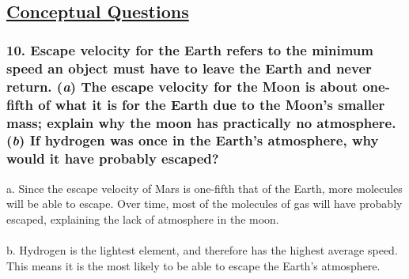 \documentclass{article}
\title{
    \vspace{2in}
    \textmd{\textbf{\hmwkTitle}}\\
    \vspace{0.5in}
    \textmd{\textbf{\hmwkClass}}\\
    \vspace{4in}
}
\author{\hmwkAuthorName}
\date{}
\begin{document}
\maketitle
\newpage
\begin{center}
    \section*{\textbf{\underline {Conceptual Questions}}}
\end{center}
\subsubsection*{
    10. Escape velocity for the Earth refers to the minimum speed an object must have
    to leave the Earth and never return. (\textit{a}) The escape velocity for the Moon
    is about one-fifth of what it is for the Earth due to the Moon's smaller mass;
    explain why the moon has practically no atmosphere. (\textit{b}) If hydrogen was
    once in the Earth's atmosphere, why would it have probably escaped?
}
a. Since the escape velocity of Mars is one-fifth that of the Earth, more molecules will be able to escape. Over time, most of the molecules of gas will have probably escaped, explaining the lack of atmosphere in the moon. 
\\\\
b. Hydrogen is the lightest element, and therefore has the highest average speed. This means it is the most likely to be able to escape the Earth's atmosphere.
\end{document}
